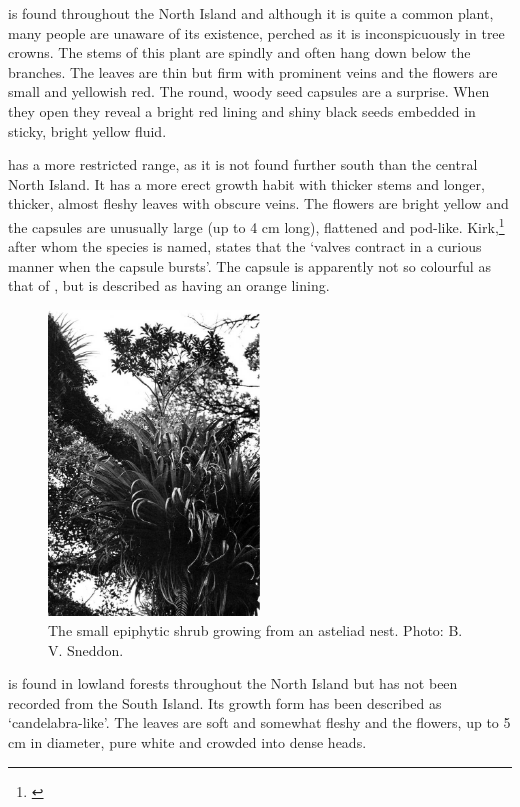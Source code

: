  is found throughout the North Island and although it is quite a common plant, many people are unaware of its existence, perched as it is inconspicuously in tree crowns.
The stems of this plant are spindly and often hang down below the branches.
The leaves are thin but firm with prominent veins and the flowers are small and yellowish red.
The round, woody seed capsules are a surprise.
When they open they reveal a bright red lining and shiny black seeds embedded in sticky, bright yellow fluid.

 has a more restricted range, as it is not found further south than the central North Island.
It has a more erect growth habit with thicker stems and longer, thicker, almost fleshy leaves with obscure veins.
The flowers are bright yellow and the capsules are unusually large (up to 4 cm long), flattened and pod-like.
Kirk,\footnote{\cite{kirk1869botany}} after whom the species is named, states that the `valves contract in a curious manner when the capsule bursts'.
The capsule is apparently not so colourful as that of , but is described as having an orange lining.

\begin{figure}
	\includegraphics[width=0.5\textwidth]{graphics/figure44brachyglottis-kirkii.jpg}
	\centering
	\caption[The small epiphytic shrub Brachyglottis kirkii]{The small epiphytic shrub  growing from an asteliad nest.
	Photo: B. V. Sneddon.}
	\label{fig:44brachyglottis-kirkii}
\end{figure}

 is found in lowland forests throughout the North Island but has not been recorded from the South Island.
Its growth form has been described as `candelabra-like'.
The leaves are soft and somewhat fleshy and the flowers, up to 5 cm in diameter, pure white and crowded into dense heads.

